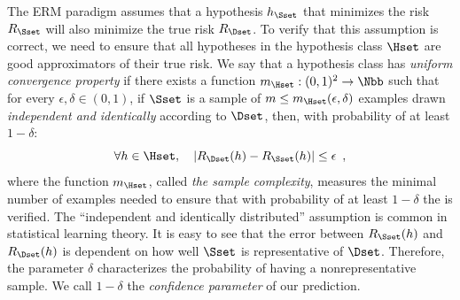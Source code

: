 The ERM paradigm assumes that a hypothesis $h_\Sset$ that minimizes the risk $R_\Sset$ will also minimize the true risk $R_\Dset$.
To verify that this assumption is correct, we need to ensure that all hypotheses in the hypothesis class $\Hset$ are good approximators of their true risk.
We say that a hypothesis class has \emph{uniform convergence property} if there exists a function $m_\Hset:(0, 1)^2 \rightarrow \Nbb$ such that for every $\epsilon, \delta \in (0, 1)$, if $\Sset$ is a sample of $m \leq m_\Hset(\epsilon, \delta)$ examples drawn \emph{independent and identically} according to $\Dset$, then, with probability of at least $1 - \delta$:
\begin{equation} \label{equation:ch2-eps_representative}
  \forall h \in \Hset, \quad |R_\Dset(h) - R_\Sset(h)| \leq \epsilon \enspace,
\end{equation}
where the function $m_\Hset$, called \emph{the sample complexity}, measures the minimal number of examples needed to ensure that with probability of at least $1 - \delta$ the  is verified.
The ``independent and identically distributed'' assumption is common in statistical learning theory.
It is easy to see that the error between $R_\Sset(h)$ and $R_\Dset(h)$ is dependent on how well $\Sset$ is representative of $\Dset$.
Therefore, the parameter $\delta$ characterizes the probability of having a nonrepresentative sample. We call $1 - \delta$ the \emph{confidence parameter} of our prediction.



